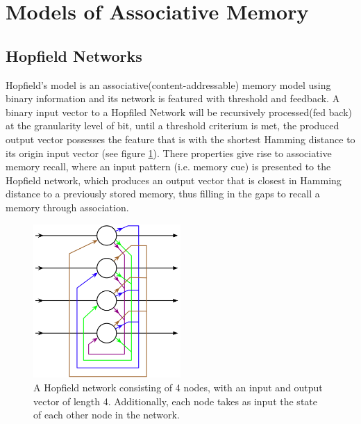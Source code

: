 \documentclass[12pt, a4paper]{article}
\begin{document}

\section{Models of Associative Memory}

\subsection{Hopfield Networks}

Hopfield's model is an associative(content-addressable) memory model using binary information and its network is featured with threshold and feedback. A binary input vector to a Hopfiled Network will be recursively processed(fed back) at the granularity level of bit, until a threshold criterium is met, the produced output vector possesses the feature that is with the shortest Hamming distance to its origin input vector (see figure \ref{fig:hopfield_network}). There properties give rise to associative memory recall, where an input pattern (i.e. memory cue) is presented to the Hopfield network, which produces an output vector that is closest in Hamming distance to a previously stored memory, thus filling in the gaps to recall a memory through association.

\begin{figure}[htbp]
	\begin{center}
		\includegraphics[width=0.5\textwidth]{inc/hopfield_network.png}
		\caption{A Hopfield network consisting of 4 nodes, with an input and output vector of length 4. Additionally, each node takes as input the state of each other node in the network.\protect\footnotemark}
		\label{fig:hopfield_network}
	\end{center}
\end{figure}
\end{document}

